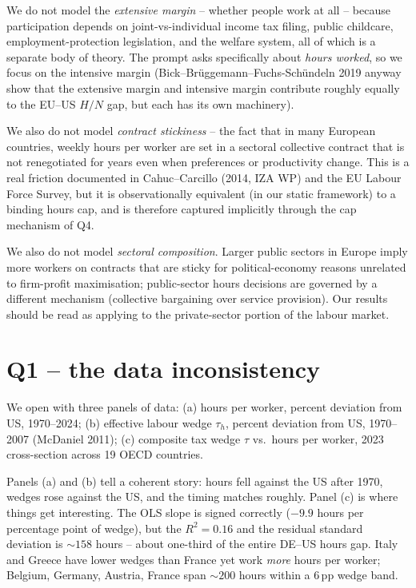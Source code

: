 \documentclass[11pt,a4paper]{article}
\begin{document}
\begin{nbox}
We do not model the \emph{extensive margin} -- whether people work at
all -- because participation depends on joint-vs-individual income tax
filing, public childcare, employment-protection legislation, and the
welfare system, all of which is a separate body of theory. The prompt
asks specifically about \emph{hours worked}, so we focus on the
intensive margin (Bick--Br\"uggemann--Fuchs-Sch\"undeln 2019 anyway show
that the extensive margin and intensive margin contribute roughly
equally to the EU--US $H/N$ gap, but each has its own machinery).

We also do not model \emph{contract stickiness} -- the fact that in
many European countries, weekly hours per worker are set in a sectoral
collective contract that is not renegotiated for years even when
preferences or productivity change. This is a real friction documented
in Cahuc--Carcillo (2014, IZA WP) and the EU Labour Force Survey, but
it is observationally equivalent (in our static framework) to a
binding hours cap, and is therefore captured implicitly through the
cap mechanism of Q4.

We also do not model \emph{sectoral composition}. Larger public
sectors in Europe imply more workers on contracts that are sticky for
political-economy reasons unrelated to firm-profit maximisation;
public-sector hours decisions are governed by a different mechanism
(collective bargaining over service provision). Our results should be
read as applying to the private-sector portion of the labour market.
\end{nbox}

\section{Q1 -- the data inconsistency}

We open with three panels of data: (a) hours per worker, percent
deviation from US, 1970--2024; (b) effective labour wedge $\tau_h$,
percent deviation from US, 1970--2007 (McDaniel 2011); (c) composite
tax wedge $\tau$ vs.\ hours per worker, 2023 cross-section across 19
OECD countries.

Panels (a) and (b) tell a coherent story: hours fell against the US
after 1970, wedges rose against the US, and the timing matches roughly.
Panel (c) is where things get interesting. The OLS slope is signed
correctly ($-9.9$ hours per percentage point of wedge), but the
$R^2\!=\!0.16$ and the residual standard deviation is $\sim\!158$
hours -- about one-third of the entire DE--US hours gap. Italy and
Greece have lower wedges than France yet work \emph{more} hours per
worker; Belgium, Germany, Austria, France span $\sim\!200$ hours within
a 6\,pp wedge band.
\end{document}
